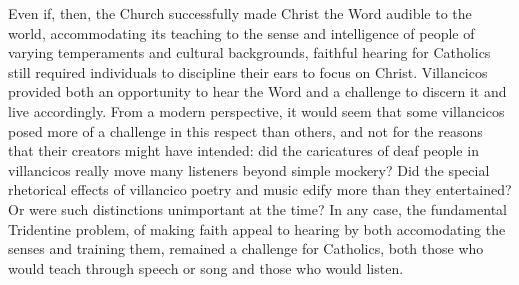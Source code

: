 Even if, then, the Church successfully made Christ the Word audible to the world,
accommodating its teaching to the sense and intelligence of people of varying
temperaments and cultural backgrounds, faithful hearing for Catholics still required
individuals to discipline their ears to focus on Christ.
Villancicos provided both an opportunity to hear the Word and a challenge to
discern it and live accordingly.
From a modern perspective, it would seem that some villancicos posed more of a
challenge in this respect than others, and not for the reasons that their
creators might have intended: did the caricatures of deaf people in villancicos
really move many listeners beyond simple mockery?
Did the special rhetorical effects of villancico poetry and music edify more
than they entertained?
Or were such distinctions unimportant at the time?
In any case, the fundamental Tridentine problem, of making faith appeal to
hearing by both accomodating the senses and training them, remained a challenge
for Catholics, both those who would teach through speech or song and those who
would listen.

